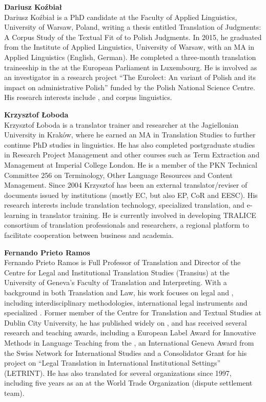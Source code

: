 \medskip\noindent
\textbf{Dariusz Koźbiał}\\
Dariusz Koźbiał is a PhD candidate at the Faculty of Applied Linguistics, University of Warsaw, Poland, writing a thesis entitled Translation of Judgments: A Corpus Study of the Textual Fit of  to Polish Judgments. In 2015, he graduated from the Institute of Applied Linguistics, University of Warsaw, with an MA in Applied Linguistics (English, German). He completed a three-month translation traineeship in the  at the European Parliament in Luxembourg. He is involved as an investigator in a research project ``The Eurolect: An  variant of Polish and its impact on administrative Polish'' funded by the Polish National Science Centre. His research interests include ,  and corpus linguistics.

\medskip\noindent
\textbf{Krzysztof Łoboda }\\
Krzysztof Łoboda is a translator trainer and researcher at the Jagiellonian University in Kraków, where he earned an MA in Translation Studies to further continue PhD studies in linguistics. He has also completed postgraduate studies in Research Project Management and other courses such as Term Extraction and Management at Imperial College London. He is a member of the PKN Technical Committee 256 on Terminology, Other Language Resources and Content Management. Since 2004 Krzysztof has been an external translator/reviser of documents issued by  institutions (mostly EC, but also EP, CoR and EESC). His research interests include translation technology, specialized translation, and e-learning in translator training. He is currently involved in developing TRALICE consortium of translation professionals and researchers, a regional platform to facilitate cooperation between business and academia.

\largerpage
\medskip\noindent
\textbf{Fernando Prieto Ramos }\\
Fernando Prieto Ramos is Full Professor of Translation and Director of the Centre for Legal and Institutional Translation Studies (Transius) at the University of Geneva's Faculty of Translation and Interpreting. With a background in both Translation and Law, his work focuses on legal and , including interdisciplinary methodologies, international legal instruments and specialized . Former member of the Centre for Translation and Textual Studies at Dublin City University, he has published widely on , and has received several research and teaching awards, including a European Label Award for Innovative Methods in Language Teaching from the , an International Geneva Award from the Swiss Network for International Studies and a Consolidator Grant for his project on “Legal Translation in International Institutional Settings” (LETRINT). He has also translated for several organizations since 1997, including five years as an  at the World Trade Organization (dispute settlement team).

